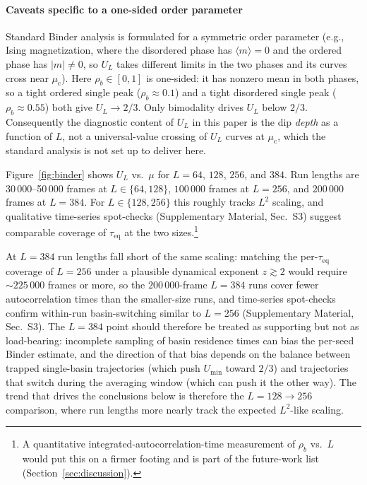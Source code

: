 \documentclass[preprint,12pt]{elsarticle}
\newcommand{\rb}{\rho_b}              %
\newcommand{\mc}{\mu_\mathrm{c}}      %
\newcommand{\Lsys}{L}                 %
\begin{document}
\paragraph{Caveats specific to a one-sided order parameter}
Standard Binder analysis is formulated for a symmetric order
parameter (e.g., Ising magnetization, where the disordered
phase has $\langle m \rangle = 0$ and the ordered phase has
$|m| \neq 0$, so $U_\Lsys$ takes different limits in the two
phases and its curves cross near $\mc$).
Here $\rb \in [0, 1]$ is one-sided: it has nonzero mean in
both phases, so a tight ordered single peak ($\rb \approx 0.1$)
and a tight disordered single peak ($\rb \approx 0.55$) both
give $U_\Lsys \to 2/3$.
Only bimodality drives $U_\Lsys$ below $2/3$.
Consequently the diagnostic content of $U_\Lsys$ in this paper
is the dip \emph{depth} as a function of $\Lsys$, not a
universal-value crossing of $U_\Lsys$ curves at $\mc$, which
the standard analysis is not set up to deliver here.

Figure~\ref{fig:binder} shows $U_\Lsys$ vs.\ $\mu$ for
$\Lsys = 64$, $128$, $256$, and $384$.
Run lengths are 30\,000--50\,000 frames at
$\Lsys \in \{64, 128\}$, $100\,000$ frames at $\Lsys = 256$,
and $200\,000$ frames at $\Lsys = 384$.
For $\Lsys \in \{128, 256\}$ this roughly tracks $\Lsys^2$
scaling, and qualitative time-series spot-checks
(Supplementary Material, Sec.~S3) suggest comparable coverage
of $\tau_\mathrm{eq}$ at the two sizes.\footnote{%
A quantitative integrated-autocorrelation-time measurement
of $\rb$ vs.\ $\Lsys$ would put this on a firmer footing and
is part of the future-work list (Section~\ref{sec:discussion}).}

At $\Lsys = 384$ run lengths fall short of the same scaling:
matching the per-$\tau_\mathrm{eq}$ coverage of $\Lsys = 256$
under a plausible dynamical exponent $z \gtrsim 2$ would
require ${\sim}225\,000$ frames or more, so the $200\,000$-frame
$\Lsys = 384$ runs cover fewer autocorrelation times than the
smaller-size runs, and time-series spot-checks confirm
within-run basin-switching similar to $\Lsys = 256$
(Supplementary Material, Sec.~S3).
The $\Lsys = 384$ point should therefore be treated as
supporting but not as load-bearing: incomplete sampling of
basin residence times can bias the per-seed Binder estimate,
and the direction of that bias depends on the balance between
trapped single-basin trajectories (which push $U_\mathrm{min}$
toward $2/3$) and trajectories that switch during the averaging
window (which can push it the other way).
The trend that drives the conclusions below is therefore the
$\Lsys = 128 \to 256$ comparison, where run lengths more
nearly track the expected $\Lsys^2$-like scaling.
\end{document}
